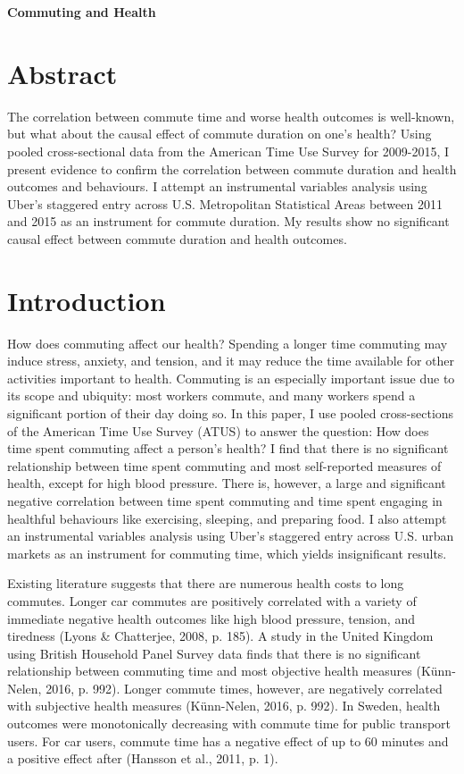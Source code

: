 \documentclass{eco481_paper}
\begin{document}
\begin{center}
    \sffamily\Large\textbf{Commuting and Health}
\end{center}
\section*{Abstract}
The correlation between commute time and worse health outcomes is well-known, but what about the causal effect of commute duration on one's health? Using pooled cross-sectional data from the American Time Use Survey for 2009-2015, I present evidence to confirm the correlation between commute duration and health outcomes and behaviours. I attempt an instrumental variables analysis using Uber's staggered entry across U.S. Metropolitan Statistical Areas between 2011 and 2015 as an instrument for commute duration. My results show no significant causal effect between commute duration and health outcomes.

\section*{Introduction}
How does commuting affect our health? Spending a longer time commuting may induce stress, anxiety, and tension, and it may reduce the time available for other activities important to health. Commuting is an especially important issue due to its scope and ubiquity: most workers commute, and many workers spend a significant portion of their day doing so. In this paper, I use pooled cross-sections of the American Time Use Survey (ATUS) to answer the question: How does time spent commuting affect a person’s health? I find that there is no significant relationship between time spent commuting and most self-reported measures of health, except for high blood pressure. There is, however, a large and significant negative correlation between time spent commuting and time spent engaging in healthful behaviours like exercising, sleeping, and preparing food. I also attempt an instrumental variables analysis using Uber’s staggered entry across U.S. urban markets as an instrument for commuting time, which yields insignificant results.

Existing literature suggests that there are numerous health costs to long commutes. Longer car commutes are positively correlated with a variety of immediate negative health outcomes like high blood pressure, tension, and tiredness (Lyons \& Chatterjee, 2008, p. 185). A study in the United Kingdom using British Household Panel Survey data finds that there is no significant relationship between commuting time and most objective health measures (Künn-Nelen, 2016, p. 992). Longer commute times, however, are negatively correlated with subjective health measures (Künn-Nelen, 2016, p. 992). In Sweden, health outcomes were monotonically decreasing with commute time for public transport users. For car users, commute time has a negative effect of up to 60 minutes and a positive effect after (Hansson et al., 2011, p. 1). 
\end{document}
